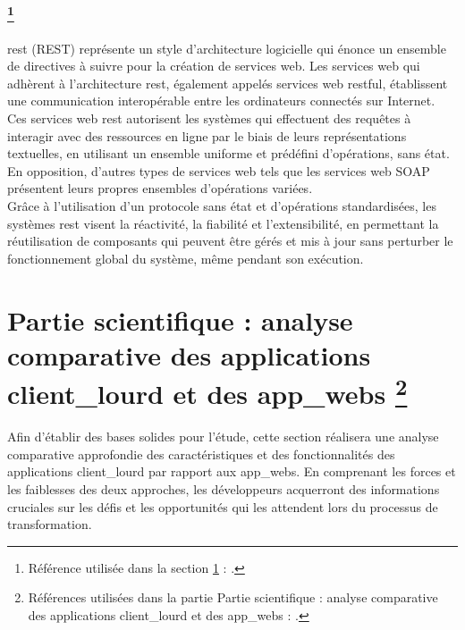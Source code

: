 \documentclass[a4paper, 12pt, french]{article}
\newcommand{\printSectionFootnote}[2]{
	\nameref{#1} \footnote{Référence utilisée dans la section \ref{#1} \nameref{#1} : \cite{#2}.}
}
\begin{document}
		\section[\acrshort{rest} : \gls{REST}]{\printSectionFootnote{subsection:cadre_theorique:rest}{wikipedia:rest}}\label{subsection:cadre_theorique:rest}
			\acrshort{rest} (\gls{REST}) représente un style d'architecture logicielle qui énonce un ensemble de directives à suivre pour la création de services web. Les services web qui adhèrent à l'architecture \acrshort{rest}, également appelés services web \acrshort{rest}ful, établissent une communication interopérable entre les ordinateurs connectés sur Internet. Ces services web \acrshort{rest} autorisent les systèmes qui effectuent des requêtes à interagir avec des ressources en ligne par le biais de leurs représentations textuelles, en utilisant un ensemble uniforme et prédéfini d'opérations, sans état. En opposition, d'autres types de services web tels que les services web SOAP présentent leurs propres ensembles d'opérations variées.\\

			Grâce à l'utilisation d'un protocole sans état et d'opérations standardisées, les systèmes \acrshort{rest} visent la réactivité, la fiabilité et l'extensibilité, en permettant la réutilisation de composants qui peuvent être gérés et mis à jour sans perturber le fonctionnement global du système, même pendant son exécution.
	
	\newpage
	\part{Partie scientifique : analyse comparative des applications \gls{client_lourd} et des \glspl{app_web} \footnote{Références utilisées dans la partie \ref{part:scientific} Partie scientifique : analyse comparative des applications \gls{client_lourd} et des \glspl{app_web} : \cite{wikipedia:client_leger}\space\cite{wikipedia:client_lourd}\space\cite{wikipedia:application_web}\space\cite{wikipedia:acces_internet}\space\cite{wikipedia:internet}\space\cite{wikipedia:plateforme_client_riche}\space\cite{wikipedia:client_informatique}\space\cite{scientific:app_master}\space\cite{scientific:eposaudio}\space\cite{scientific:journal_net}\space\cite{scientific:profolus}\space\cite{scientific:audiviklabs}\space\cite{scientific:minnalearn}\space\cite{scientific:cyberpreventys}\space\cite{scientific:techtarget}\space\cite{scientific:techgenix}\space\cite{scientific:baeldung}\space\cite{scientific:ionos_client_lourd}\space\cite{scientific:agence_scroll}\space\cite{scientific:yeeply}\space\cite{scientific:digitiz}\space\cite{scientific:hicones}\space\cite{scientific:yourstory}\space\cite{scientific:ionos_client_leger}\space\cite{scientific:proofpoint}\space\cite{scientific:bluemind}.}}\label{part:scientific}
		Afin d'établir des bases solides pour l'étude, cette section réalisera une analyse comparative approfondie des caractéristiques et des fonctionnalités des applications \gls{client_lourd} par rapport aux \glspl{app_web}. En comprenant les forces et les faiblesses des deux approches, les développeurs acquerront des informations cruciales sur les défis et les opportunités qui les attendent lors du processus de transformation.
		
\end{document}
